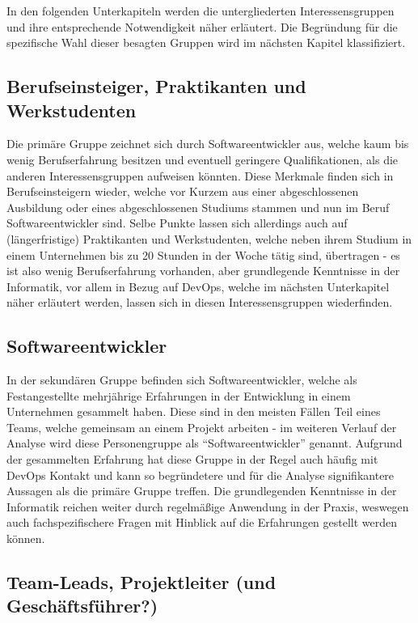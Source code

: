 In den folgenden Unterkapiteln werden die untergliederten Interessensgruppen und ihre entsprechende Notwendigkeit näher erläutert. Die Begründung für die spezifische Wahl dieser besagten Gruppen wird im
nächsten Kapitel klassifiziert.

\subsection{Berufseinsteiger, Praktikanten und Werkstudenten}
Die primäre Gruppe zeichnet sich durch Softwareentwickler aus, welche kaum bis wenig Berufserfahrung besitzen und eventuell geringere Qualifikationen, als die anderen Interessensgruppen aufweisen könnten.
Diese Merkmale finden sich in Berufseinsteigern wieder, welche vor Kurzem aus einer abgeschlossenen Ausbildung oder eines abgeschlossenen Studiums stammen und nun im Beruf Softwareentwickler sind. Selbe Punkte
lassen sich allerdings auch auf (längerfristige) Praktikanten und Werkstudenten, welche neben ihrem Studium in einem Unternehmen bis zu 20 Stunden in der Woche tätig sind, übertragen - es ist also wenig Berufserfahrung
vorhanden, aber grundlegende Kenntnisse in der Informatik, vor allem in Bezug auf DevOps, welche im nächsten Unterkapitel näher erläutert werden, lassen sich in diesen Interessensgruppen wiederfinden.

\subsection{Softwareentwickler}
In der sekundären Gruppe befinden sich Softwareentwickler, welche als Festangestellte mehrjährige Erfahrungen in der Entwicklung in einem Unternehmen gesammelt haben. Diese sind in den meisten Fällen Teil eines Teams, welche gemeinsam an einem Projekt arbeiten
- im weiteren Verlauf der Analyse wird diese Personengruppe als \enquote{Softwareentwickler} genannt. Aufgrund der gesammelten Erfahrung hat diese Gruppe in der Regel auch häufig mit DevOps Kontakt und kann so begründetere und für die Analyse signifikantere
Aussagen als die primäre Gruppe treffen. Die grundlegenden Kenntnisse in der Informatik reichen weiter durch regelmäßige Anwendung in der Praxis, weswegen auch fachspezifischere Fragen mit Hinblick auf die Erfahrungen gestellt werden können.

\subsection{Team-Leads, Projektleiter (und Geschäftsführer?)}

